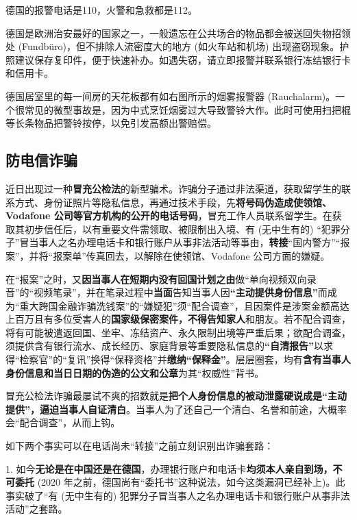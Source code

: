     德国的报警电话是110，火警和急救都是112。

    德国是欧洲治安最好的国家之一，一般遗忘在公共场合的物品都会被送回失物招领处 (Fundbüro)，但不排除人流密度大的地方 (如火车站和机场) 出现盗窃现象。护照建议保存复印件，便于快速补办。如遇失窃，请立即报警并联系银行冻结银行卡和信用卡。

    德国居室里的每一间房的天花板都有如右图所示的烟雾报警器 (Rauchalarm)。一个很常见的微型事故是，因为中式烹饪烟雾过大导致警铃大作。此时可使用扫把棍等长条物品把警铃按停，以免引发高额出警赔偿。

  \subsection{防电信诈骗}\label{subsec:防电信诈骗}

    近日出现过一种\textbf{冒充公检法}的新型骗术。诈骗分子通过非法渠道，获取留学生的联系方式、身份证照片等隐私信息，再通过技术手段，先\textbf{将号码伪造成使领馆、Vodafone 公司等官方机构的公开的电话号码}，冒充工作人员联系留学生。在获取其初步信任后，以有重要文件需领取、被限制出入境、有 (无中生有的) ``犯罪分子''冒当事人之名办理电话卡和银行账户从事非法活动等事由，\textbf{转接}``国内警方''``报案''，并将``报案单''传真回去，以解除在使领馆、Vodafone 公司方面的嫌疑。

    在``报案''之时，又\textbf{因当事人在短期内没有回国计划之由}做``单向视频双向录音''的``视频笔录''，并在笔录过程中\textbf{当面}告知当事人因\textbf{``主动提供身份信息''}而成为``重大跨国金融诈骗洗钱案''的``嫌疑犯''须``配合调查''，且因案件是涉案金额高达上百万且有多位受害人的\textbf{国家级保密案件，不得告知家人}和朋友。若不配合调查，将有可能被遣返回国、坐牢、冻结资产、永久限制出境等严重后果；欲配合调查，须提供含有银行流水、成长经历、家庭背景等重要隐私信息的\textbf{``自清报告''}以求得``检察官''的``复讯''换得``保释资格''并\textbf{缴纳``保释金''}。层层圈套，均有\textbf{含有当事人身份信息和当日日期的伪造的公文和公章}为其``权威性''背书。

    冒充公检法诈骗最屡试不爽的招数就是\textbf{把个人身份信息的被动泄露硬说成是``主动提供''，逼迫当事人自证清白}。当事人为了还自己一个清白、名誉和前途，大概率会``配合调查''，从而上钩。

    如下两个事实可以在电话尚未``转接''之前立刻识别出诈骗套路：

    1. 如今\textbf{无论是在中国还是在德国}，办理银行账户和电话卡\textbf{均须本人亲自到场，不可委托} (2020 年之前，德国尚有``委托书''这种说法，如今这类漏洞已经补上)。此事实破了``有 (无中生有的) 犯罪分子冒当事人之名办理电话卡和银行账户从事非法活动''之套路。

